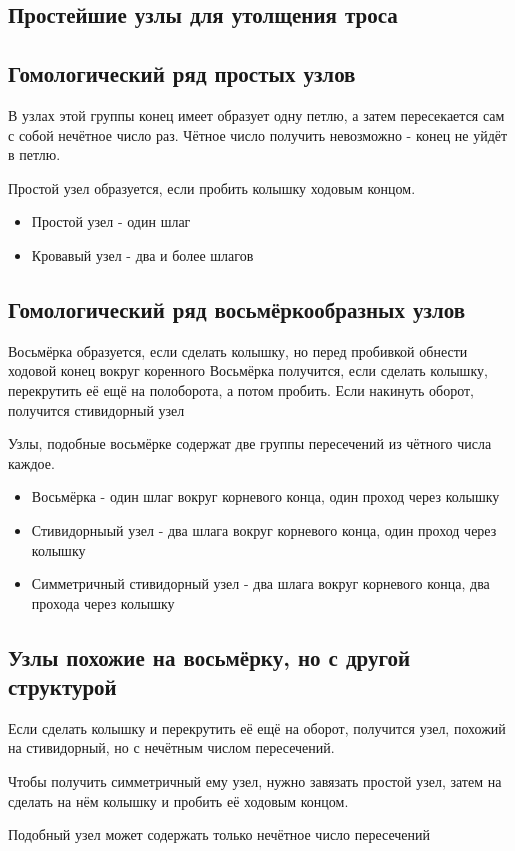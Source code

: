 \subsection{Простейшие узлы для утолщения троса}

\subsection{Гомологический ряд простых узлов}
В узлах этой группы конец имеет образует одну петлю, а затем пересекается сам с собой нечётное число раз.
Чётное число получить невозможно - конец не уйдёт в петлю.

Простой узел образуется, если пробить колышку ходовым концом.
\begin{itemize}
\item Простой узел - один шлаг 

\item Кровавый узел - два и более шлагов 

\end{itemize}

\subsection{Гомологический ряд восьмёркообразных узлов}

Восьмёрка образуется, если сделать колышку, но перед пробивкой обнести ходовой конец вокруг коренного
Восьмёрка получится, если сделать колышку, перекрутить её ещё на полоборота, а потом пробить.
Если накинуть оборот, получится стивидорный узел

Узлы, подобные восьмёрке содержат две группы пересечений из чётного числа каждое.

\begin{itemize}
\item Восьмёрка - один шлаг вокруг корневого конца, один проход через колышку

\item Стивидорныый узел - два шлага вокруг корневого конца, один проход через колышку

\item Симметричный стивидорный узел - два шлага вокруг корневого конца, два прохода через колышку
\end{itemize}

\subsection{Узлы похожие на восьмёрку, но с другой структурой}

Если сделать колышку и перекрутить её ещё на оборот, получится узел, похожий на стивидорный, но с нечётным числом пересечений.

Чтобы получить симметричный ему узел, нужно завязать простой узел, затем на сделать на нём колышку и пробить её ходовым концом.

Подобный узел может содержать только нечётное число пересечений